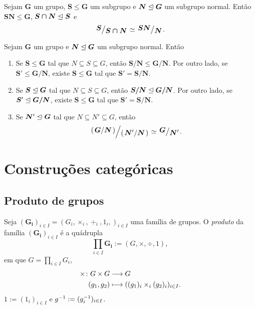 \begin{theorem}
Sejam $\bm G$ um grupo, $\bm S \leq \bm G$ um subgrupo e $\bm N \mathrel{\unlhd} \bm G$ um subgrupo normal. Então $\bm{SN} \leq \bm G$, $\bm{S \cap N} \mathrel{\unlhd} \bm S$ e
	\begin{equation*}
	\bm{\quo{S}{S \cap N}} \simeq \bm{\quo{SN}{N}}.
	\end{equation*}
\end{theorem}

\begin{theorem}
Sejam $\bm G$ um grupo e $\bm N \mathrel{\unlhd} \bm G$ um subgrupo normal. Então
	\begin{enumerate}
	\item Se $\bm S \leq \bm G$ tal que $N \subseteq S \subseteq G$, então $\bm{S/N} \leq \bm{G/N}$. Por outro lado, se $\bm S' \leq \bm{G/N}$, existe $\bm S \leq \bm G$ tal que $\bm S' = \bm{S/N}$.
	\item Se $\bm S \mathrel{\unlhd} \bm G$ tal que $N \subseteq S \subseteq G$, então $\bm{S/N} \mathrel{\unlhd} \bm{G/N}$. Por outro lado, se $\bm S' \mathrel{\unlhd} \bm{G/N}$, existe $\bm S \leq \bm G$ tal que $\bm S' = \bm{S/N}$.
	\item Se $\bm N' \mathrel{\unlhd} \bm G$ tal que $N \subseteq N' \subseteq G$, então
		\begin{equation*}
		\quo{\left(\quo{\bm G}{\bm N}\right)}{\left(\quo{\bm N'}{\bm N}\right)} \simeq \quo{\bm G}{\bm N'}.
		\end{equation*}
	\end{enumerate}
\end{theorem}


\cleardoublepage
\section{Construções categóricas}

\subsection{Produto de grupos}

\begin{definition}
Seja $(\bm{G_i})_{i \in I}=(G_i,\times_i,\div_i,1_i,)_{i \in I}$ uma família de grupos. O \emph{produto} da família $(\bm{G_i})_{i \in I}$ é a quádrupla
	\begin{equation*}
	\prod_{i \in I} \bm{G_i} := (G,\times,\div,1),
	\end{equation*}
em que $G = \prod_{i \in I} G_i$,
	\begin{align*}
	{\times}\colon {G \times G} &\longrightarrow {G} \\{(g_1,g_2)} &\longmapsto ((g_1)_i \times_i (g_2)_i)_{i \in I}.
	\end{align*}
$1 := (1_i)_{i \in I}$ e $g^{-1} := (g_i^{-1})_{i \in I}$.
\end{definition}

